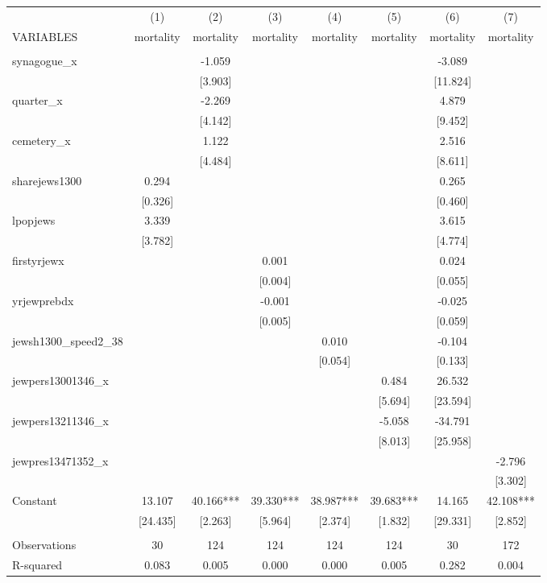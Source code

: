 \documentclass[]{article}
\begin{document}
\begin{tabular}{lccccccc} \hline
 & (1) & (2) & (3) & (4) & (5) & (6) & (7) \\
VARIABLES & mortality & mortality & mortality & mortality & mortality & mortality & mortality \\ \hline
 &  &  &  &  &  &  &  \\
synagogue\_x &  & -1.059 &  &  &  & -3.089 &  \\
 &  & [3.903] &  &  &  & [11.824] &  \\
quarter\_x &  & -2.269 &  &  &  & 4.879 &  \\
 &  & [4.142] &  &  &  & [9.452] &  \\
cemetery\_x &  & 1.122 &  &  &  & 2.516 &  \\
 &  & [4.484] &  &  &  & [8.611] &  \\
sharejews1300 & 0.294 &  &  &  &  & 0.265 &  \\
 & [0.326] &  &  &  &  & [0.460] &  \\
lpopjews & 3.339 &  &  &  &  & 3.615 &  \\
 & [3.782] &  &  &  &  & [4.774] &  \\
firstyrjewx &  &  & 0.001 &  &  & 0.024 &  \\
 &  &  & [0.004] &  &  & [0.055] &  \\
yrjewprebdx &  &  & -0.001 &  &  & -0.025 &  \\
 &  &  & [0.005] &  &  & [0.059] &  \\
jewsh1300\_speed2\_38 &  &  &  & 0.010 &  & -0.104 &  \\
 &  &  &  & [0.054] &  & [0.133] &  \\
jewpers13001346\_x &  &  &  &  & 0.484 & 26.532 &  \\
 &  &  &  &  & [5.694] & [23.594] &  \\
jewpers13211346\_x &  &  &  &  & -5.058 & -34.791 &  \\
 &  &  &  &  & [8.013] & [25.958] &  \\
jewpres13471352\_x &  &  &  &  &  &  & -2.796 \\
 &  &  &  &  &  &  & [3.302] \\
Constant & 13.107 & 40.166*** & 39.330*** & 38.987*** & 39.683*** & 14.165 & 42.108*** \\
 & [24.435] & [2.263] & [5.964] & [2.374] & [1.832] & [29.331] & [2.852] \\
 &  &  &  &  &  &  &  \\
Observations & 30 & 124 & 124 & 124 & 124 & 30 & 172 \\
 R-squared & 0.083 & 0.005 & 0.000 & 0.000 & 0.005 & 0.282 & 0.004 \\ \hline
\end{tabular}
\end{document}
